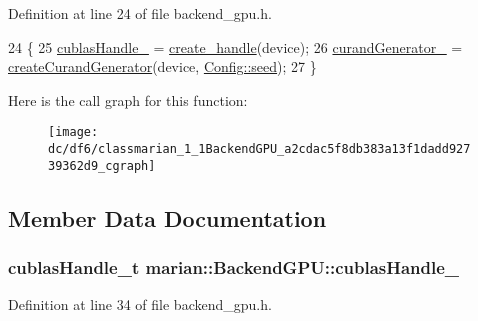 Definition at line 24 of file backend\+\_\+gpu.\+h.


\begin{DoxyCode}
24                                               \{
25     \hyperlink{classmarian_1_1BackendGPU_a810b6cd016639ed114076ad69f8a8df9}{cublasHandle\_} = \hyperlink{classmarian_1_1BackendGPU_a48b75aa1fb526adafaaad99281518d08}{create\_handle}(device);
26     \hyperlink{classmarian_1_1BackendGPU_a9988ccab12ceb4e0dc920c12394484e6}{curandGenerator\_} = \hyperlink{classmarian_1_1BackendGPU_a47ba8ab67609328e2ac7239f96776c52}{createCurandGenerator}(device, 
      \hyperlink{classmarian_1_1Config_a5261277034b2e2268225bfbc32682cb4}{Config::seed});
27   \}
\end{DoxyCode}


Here is the call graph for this function\+:
\nopagebreak
\begin{figure}[H]
\begin{center}
\leavevmode
\texttt{[image: dc/df6/classmarian\_1\_1BackendGPU\_a2cdac5f8db383a13f1dadd92739362d9\_cgraph]}
\end{center}
\end{figure}




\subsection{Member Data Documentation}
\subsubsection[{\texorpdfstring{cublas\+Handle\+\_\+}{cublasHandle_}}]{\setlength{\rightskip}{0pt plus 5cm}cublas\+Handle\+\_\+t marian\+::\+Backend\+G\+P\+U\+::cublas\+Handle\+\_\+\hspace{0.3cm}{\ttfamily [private]}}\hypertarget{classmarian_1_1BackendGPU_a810b6cd016639ed114076ad69f8a8df9}{}\label{classmarian_1_1BackendGPU_a810b6cd016639ed114076ad69f8a8df9}


Definition at line 34 of file backend\+\_\+gpu.\+h.

